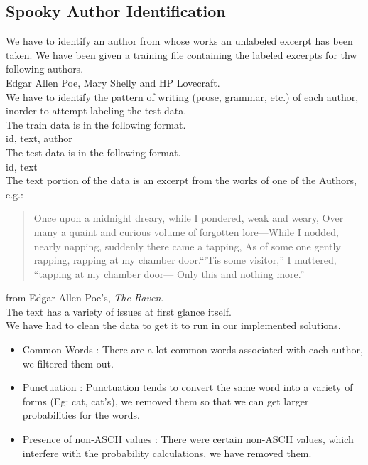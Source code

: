 \documentclass[fleqn,10pt]{SelfArx} %
\begin{document}
\subsection{Spooky Author Identification}
We have to identify an author from whose works an unlabeled excerpt has been taken.
We have been given a training file containing the labeled excerpts for thw following authors.\\
Edgar Allen Poe, Mary Shelly and HP Lovecraft.\\
We have to identify the pattern of writing (prose, grammar, etc.) of each author, inorder to attempt labeling the test-data.\\
The train data is in the following format.\\
id, text, author\\
The test data is in the following format.\\
id, text\\
The text portion of the data is an excerpt from the works of one of the Authors, e.g.:
\begin{quote}
	Once upon a midnight dreary, while I pondered, weak and weary, Over many a quaint and curious volume of forgotten lore—While I nodded, nearly napping, suddenly there came a tapping, As of some one gently rapping, rapping at my chamber door.“’Tis some visitor,” I muttered, “tapping at my chamber door— Only this and nothing more.”
\end{quote}from Edgar Allen Poe's, \textit{The Raven}. \\
The text has a variety of issues at first glance itself.\\
We have had to clean the data to get it to run in our implemented solutions.
\begin{itemize}[noitemsep]
	\item Common Words : There are a lot common words associated with each author, we filtered them out.
	\item Punctuation : Punctuation tends to convert the same word into a variety of forms (Eg: cat, cat's), we removed them so that we can get larger probabilities for the words.
	\item Presence of non-ASCII values : There were certain non-ASCII values, which interfere with the probability calculations, we have removed them.
\end{itemize}
\end{document}
